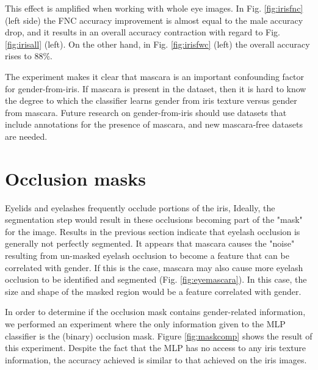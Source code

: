 \documentclass[10pt,twocolumn,letterpaper]{article}
\begin{document}
This effect is amplified when working with whole eye images.
In Fig. \ref{fig:irisfnc} (left side) the FNC accuracy improvement is almost equal to the male accuracy drop, and it results in an overall accuracy contraction with regard to Fig. \ref{fig:irisall} (left).
On the other hand, in Fig. \ref{fig:irisfwc} (left) the overall accuracy rises to $88\%$. 

The experiment makes it clear that mascara is an important confounding factor for gender-from-iris.
If mascara is present in the dataset, then it is hard to know the degree to which the classifier learns gender from iris texture versus gender from mascara.
Future research on gender-from-iris should use datasets that include annotations for the presence of mascara, and new mascara-free datasets are needed.

\section{Occlusion masks}
\label{sec:irisocclusions}

Eyelids and eyelashes frequently occlude portions of the iris,
Ideally, the segmentation step would result in these occlusions becoming part of the "mask" for the image.
Results in the previous section indicate that eyelash occlusion is generally not perfectly segmented. 
It appears that mascara causes the "noise" resulting from un-masked eyelash occlusion to become a feature that can be correlated with gender.
If this is the case, mascara may also cause more eyelash occlusion to be identified and segmented (Fig. \ref{fig:eyemascara}).
In this case, the size and shape of the masked region would be a feature correlated with gender.

In order to determine if the occlusion mask contains gender-related information,
we performed an experiment where the only information given to the MLP classifier is the (binary) occlusion mask. 
Figure \ref{fig:maskcomp} shows the result of this experiment.
Despite the fact that the MLP has no access to any iris texture information, the accuracy achieved is  similar to that achieved on the iris images. 
\end{document}
